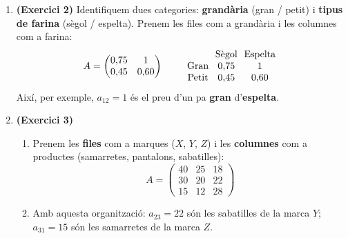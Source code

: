 \documentclass[12pt,a4paper]{article}
\newcommand{\blocInici}{%
  \par\nobreak\vspace{0pt}%
  \begin{minipage}[t]{\linewidth}%
}
\newcommand{\blocFi}{%
  \end{minipage}%
  \par
}
\begin{document}
\vspace{0.4em}
\begin{enumerate}[leftmargin=*,itemsep=0.85em,parsep=0.25em]

\item
{}%
\blocInici
\textbf{(Exercici 2)}
Identifiquem dues categories: \textbf{grandària} (gran / petit)
i \textbf{tipus de farina} (sègol / espelta).
Prenem les files com a grandària i les columnes com a farina:
\[
  A =
  \begin{pmatrix}
    0{,}75 & 1 \\
    0{,}45 & 0{,}60
  \end{pmatrix}
  \qquad
  \begin{array}{c@{\hspace{0.7em}}c@{\hspace{0.7em}}c}
      & \text{Sègol} & \text{Espelta} \\
    \text{Gran}  & 0{,}75 & 1 \\
    \text{Petit} & 0{,}45 & 0{,}60
  \end{array}
\]
Així, per exemple, $a_{12}=1$ és el preu d'un pa \textbf{gran} d'\textbf{espelta}.
\blocFi

\item
{}%
\blocInici
\textbf{(Exercici 3)}
\begin{enumerate}[label=\alph*),leftmargin=1.2em,itemsep=0.35em]
  \item Prenem les \textbf{files} com a marques ($X$, $Y$, $Z$)
    i les \textbf{columnes} com a productes (samarretes, pantalons, sabatilles):
    \[
      A =
      \begin{pmatrix}
        40 & 25 & 18 \\
        30 & 20 & 22 \\
        15 & 12 & 28
      \end{pmatrix}
    \]
  \item Amb aquesta organització:
    $a_{23}=22$ són les sabatilles de la marca $Y$;
    $a_{31}=15$ són les samarretes de la marca $Z$.
\end{enumerate}
\blocFi


\end{enumerate}
\end{document}
